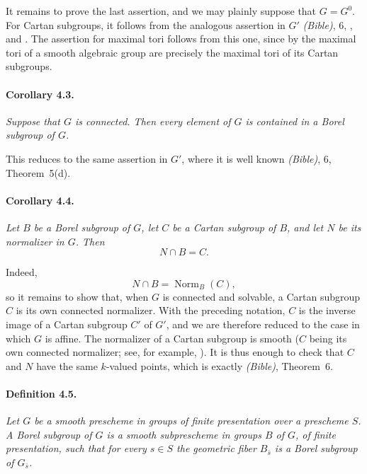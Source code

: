 It remains to prove the last assertion, and we may plainly suppose
that \(G=G^0\). For Cartan subgroups, it follows from the analogous
assertion in \(G'\)
\textup{\emph{(Bible)}, 6, , }
and \textup{}. The assertion for maximal tori follows from
this one, since by \textup{} the maximal tori of a smooth
algebraic group are precisely the maximal tori of its Cartan
subgroups.

\paragraph{\textbf{Corollary 4.3.}}
{\itshape Suppose that \(G\) is connected. Then every element of
\(G\) is contained in a Borel subgroup of \(G\).}

This reduces to the same assertion in \(G'\), where it is well known
\textup{\emph{(Bible)}, 6, Theorem~5\textup{(d)}}.

\paragraph{\textbf{Corollary 4.4.}}
{\itshape Let \(B\) be a Borel subgroup of \(G\), let \(C\) be a
Cartan subgroup of \(B\), and let \(N\) be its normalizer in \(G\).
Then
\[
  N\cap B=C.
\]}

Indeed,
\[
  N\cap B=\operatorname{Norm}_B(C),
\]
so it remains to show that, when \(G\) is connected and solvable, a
Cartan subgroup \(C\) is its own connected normalizer. With the
preceding notation, \(C\) is the inverse image of a Cartan subgroup
\(C'\) of \(G'\), and we are therefore reduced to the case in which
\(G\) is affine. The normalizer of a Cartan subgroup is smooth
\textup{(\(C\) being its own connected normalizer; see, for example,
\textup{})}. It is thus enough to check that \(C\) and
\(N\) have the same \(k\)-valued points, which is exactly
\textup{\emph{(Bible)}, Theorem~6\textup{}}.

\paragraph{\textbf{Definition 4.5.}}
{\itshape Let \(G\) be a smooth prescheme in groups of finite
presentation over a prescheme \(S\). A \emph{Borel subgroup} of
\(G\) is a smooth subprescheme in groups \(B\) of \(G\), of finite
presentation, such that for every \(s\in S\) the geometric fiber
\(B_{\bar s}\) is a Borel subgroup of \(G_{\bar s}\).}

